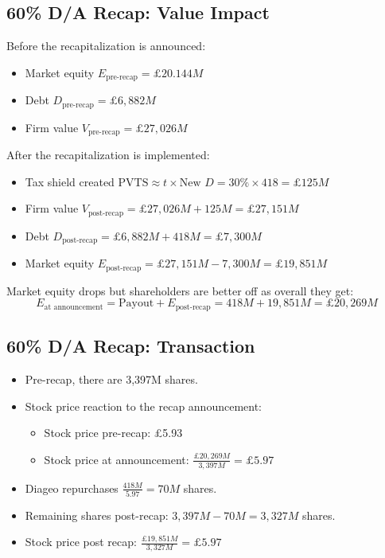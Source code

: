 \subsection*{60\% D/A Recap: Value Impact}

Before the recapitalization is announced:
\begin{itemize}
    \item Market equity \( E_{\text{pre-recap}} = £20.144M \)
    \item Debt \( D_{\text{pre-recap}} = £6,882M \)
    \item Firm value \( V_{\text{pre-recap}} = £27,026M \)
\end{itemize}

After the recapitalization is implemented:
\begin{itemize}
    \item Tax shield created \( \text{PVTS} \approx t \times \text{New } D = 30\% \times 418 = £125M \)
    \item Firm value \( V_{\text{post-recap}} = £27,026M + 125M = £27,151M \)
    \item Debt \( D_{\text{post-recap}} = £6,882M + 418M = £7,300M \)
    \item Market equity \( E_{\text{post-recap}} = £27,151M - 7,300M = £19,851M \)
\end{itemize}

Market equity drops but shareholders are better off as overall they get:
\[
E_{\text{at announcement}} = \text{Payout} + E_{\text{post-recap}} = 418M + 19,851M = £20,269M
\]

\subsection*{60\% D/A Recap: Transaction}

\begin{itemize}
    \item Pre-recap, there are 3,397M shares.
    \item Stock price reaction to the recap announcement:
    \begin{itemize}
        \item Stock price pre-recap: £5.93
        \item Stock price at announcement: \( \frac{£20,269M}{3,397M} = £5.97 \)
    \end{itemize}
    \item Diageo repurchases \( \frac{418M}{5.97} = 70M \) shares.
    \item Remaining shares post-recap: \( 3,397M - 70M = 3,327M \) shares.
    \item Stock price post recap: \( \frac{£19,851M}{3,327M} = £5.97 \)
\end{itemize}

